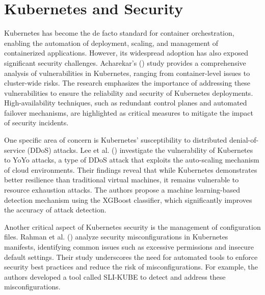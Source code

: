 

\chapter{Kubernetes and Security} \label{cha:kubernetesAndSecurity}

Kubernetes has become the de facto standard for container orchestration, enabling the automation of deployment, scaling, and management of containerized applications. However, its widespread adoption has also exposed significant security challenges. Acharekar's (\citeyear{acharekar_exploring_2024}) study provides a comprehensive analysis of vulnerabilities in Kubernetes, ranging from container-level issues to cluster-wide risks. The research emphasizes the importance of addressing these vulnerabilities to ensure the reliability and security of Kubernetes deployments. High-availability techniques, such as redundant control planes and automated failover mechanisms, are highlighted as critical measures to mitigate the impact of security incidents.

One specific area of concern is Kubernetes' susceptibility to distributed denial-of-service (DDoS) attacks. Lee et al. (\citeyear{lee_experimental_2023}) investigate the vulnerability of Kubernetes to YoYo attacks, a type of DDoS attack that exploits the auto-scaling mechanism of cloud environments. Their findings reveal that while Kubernetes demonstrates better resilience than traditional virtual machines, it remains vulnerable to resource exhaustion attacks. The authors propose a machine learning-based detection mechanism using the XGBoost classifier, which significantly improves the accuracy of attack detection.

Another critical aspect of Kubernetes security is the management of configuration files. Rahman et al. (\citeyear{rahman_security_2023}) analyze security misconfigurations in Kubernetes manifests, identifying common issues such as excessive permissions and insecure default settings. Their study underscores the need for automated tools to enforce security best practices and reduce the risk of misconfigurations. For example, the authors developed a tool called SLI-KUBE to detect and address these misconfigurations.
